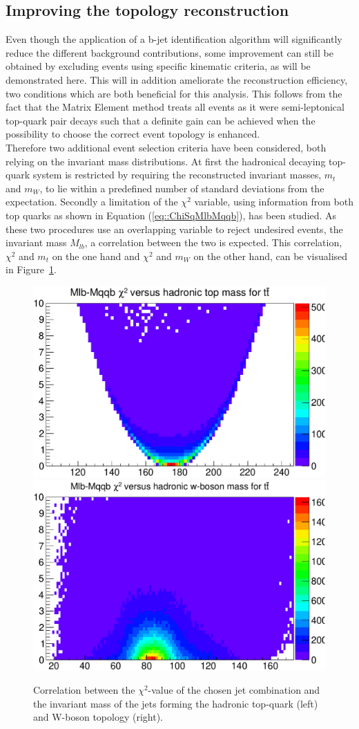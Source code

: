 \subsection{Improving the topology reconstruction}\label{subsec::MassCuts}
Even though the application of a b-jet identification algorithm will significantly reduce the different background contributions, some improvement can still be obtained by excluding events using specific kinematic criteria, as will be demonstrated here. This will in addition ameliorate the reconstruction efficiency, two conditions which are both beneficial for this analysis.
This follows from the fact that the Matrix Element method treats all events as it were semi-leptonical top-quark pair decays such that a definite gain can be achieved when the possibility to choose the correct event topology is enhanced.
\\
Therefore two additional event selection criteria have been considered, both relying on the invariant mass distributions. %
At first the hadronical decaying top-quark system is restricted by requiring the reconstructed invariant masses, $m_t$ and $m_W$, to lie within a predefined number of standard deviations from the expectation. Secondly a limitation of the $\chi^{2}$ variable, using information from both top quarks as shown in Equation (\ref{eq::ChiSqMlbMqqb}), has been studied.
As these two procedures use an overlapping variable to reject undesired events, the invariant mass $M_{lb}$, a correlation between the two is expected.
This correlation, $\chi^{2}$ and $m_{t}$ on the one hand and $\chi^{2}$ and $m_{W}$ on the other hand, can be visualised in Figure~\ref{fig::2Dexclusion}.

\begin{figure}[h!t]
 \centering
 \includegraphics[width = 0.45 \textwidth]{Chapters/Chapter4_EvtSel/Figures/MqqbVSChiSq.pdf} %
 \includegraphics[width = 0.45 \textwidth]{Chapters/Chapter4_EvtSel/Figures/MlbVSChiSq.pdf} %
 \caption{Correlation between the $\chi^{2}$-value of the chosen jet combination and the invariant mass of the jets forming the hadronic top-quark (left) and W-boson topology (right).} \label{fig::2Dexclusion}
\end{figure}

